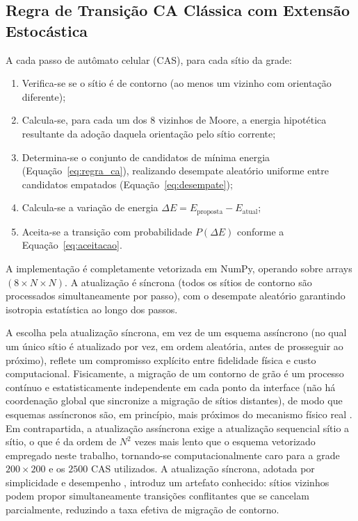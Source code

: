 \documentclass[12pt,a4paper]{article}
\begin{document}
\subsection{Regra de Transição CA Clássica com Extensão Estocástica}

A cada passo de autômato celular (CAS), para cada sítio da grade:
\begin{enumerate}
    \item Verifica-se se o sítio é de contorno (ao menos um vizinho com orientação
          diferente);
    \item Calcula-se, para cada um dos 8 vizinhos de Moore, a energia hipotética
          resultante da adoção daquela orientação pelo sítio corrente;
    \item Determina-se o conjunto de candidatos de mínima energia (Equação~\ref{eq:regra_ca}),
          realizando desempate aleatório uniforme entre candidatos empatados
          (Equação~\ref{eq:desempate});
    \item Calcula-se a variação de energia $\Delta E = E_{\text{proposta}} - E_{\text{atual}}$;
    \item Aceita-se a transição com probabilidade $P(\Delta E)$ conforme a
          Equação~\ref{eq:aceitacao}.
\end{enumerate}

A implementação é completamente vetorizada em NumPy, operando sobre arrays
$(8 \times N \times N)$. A atualização é síncrona
(todos os sítios de contorno são processados simultaneamente por passo), com o
desempate aleatório garantindo isotropia estatística ao longo dos passos.

A escolha pela atualização síncrona, em vez de um esquema assíncrono (no qual um
único sítio é atualizado por vez, em ordem aleatória, antes de prosseguir ao
próximo), reflete um compromisso explícito entre fidelidade física e custo
computacional. Fisicamente, a migração de um contorno de grão é um processo
contínuo e estatisticamente independente em cada ponto da interface (não há
coordenação global que sincronize a migração de sítios distantes), de modo que
esquemas assíncronos são, em princípio, mais próximos do mecanismo físico real
\cite{janssens2010}. Em contrapartida, a atualização assíncrona exige a
atualização sequencial sítio a sítio, o que é da ordem de $N^2$ vezes mais lento
que o esquema vetorizado empregado neste trabalho, tornando-se computacionalmente
caro para a grade $200\times200$ e os $2500$ CAS utilizados. A atualização
síncrona, adotada por simplicidade e desempenho \cite{raghavan2007}, introduz um
artefato conhecido: sítios vizinhos podem propor simultaneamente transições
conflitantes que se cancelam parcialmente, reduzindo a taxa efetiva de migração de
contorno. 
\end{document}
